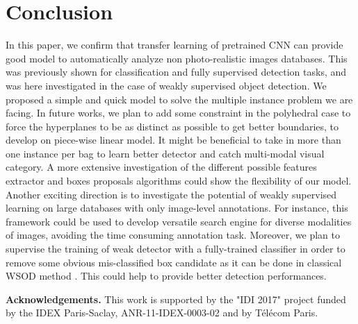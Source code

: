 \documentclass[preprint]{elsarticle}
\begin{document}
\FloatBarrier
\section{Conclusion}
\label{sec:ccl}
  In this paper, we confirm that transfer learning of pretrained CNN can provide good model to automatically analyze non photo-realistic images databases. This was previously shown for classification and fully supervised detection tasks, and was here investigated in the case of weakly supervised object detection. We proposed a simple and quick model to solve the multiple instance problem we are facing. 
  In future works, we plan to add some constraint in the polyhedral case to force the hyperplanes to be as distinct as possible to get better boundaries, to develop on piece-wise linear model. It might be beneficial to take in more than one instance per bag to learn better detector and catch multi-modal visual category. 
  A more extensive investigation of the different possible features extractor and boxes proposals algorithms could show the flexibility of our model.
  Another exciting direction is to investigate the potential of weakly supervised learning on large databases with only image-level annotations. For instance, this framework could be used to develop versatile search engine for diverse modalities of images, avoiding the time consuming annotation task.
 Moreover, we plan to supervise the training of weak detector with a fully-trained classifier in order to remove some obvious mis-classified box candidate as it can be done in classical WSOD method \citep{wan_minentropy_2018}. This could help to provide better detection performances. 
 
 
\vspace{1cm}
{\noindent \bf Acknowledgements.}
 This work is supported by the "IDI 2017" project funded by the IDEX Paris-Saclay, ANR-11-IDEX-0003-02 and by T\'el\'ecom Paris.


{\small

}
\end{document}
